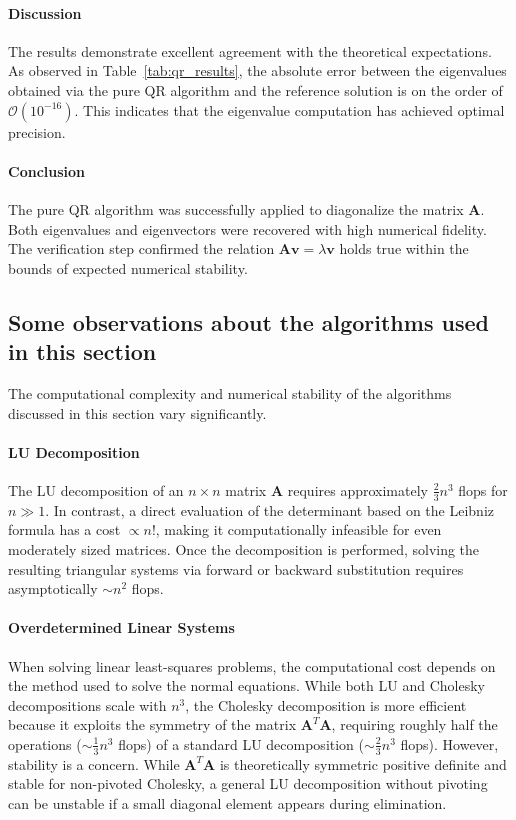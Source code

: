\begin{solution}
	\paragraph{Discussion}
	The results demonstrate excellent agreement with the theoretical
	expectations. As observed in Table~\ref{tab:qr_results}, the absolute error
	between the eigenvalues obtained via the pure QR algorithm and the reference
	solution is on the order of $\mathcal{O}(10^{-16})$. This indicates that the
	eigenvalue computation has achieved optimal precision.

	\paragraph{Conclusion}
	The pure QR algorithm was successfully applied to diagonalize the matrix
	$\mathbf{A}$. Both eigenvalues and eigenvectors were recovered with high
	numerical fidelity. The verification step confirmed the relation
	$\mathbf{A}\mathbf{v} = \lambda\mathbf{v}$ holds true within the bounds of
	expected numerical stability.

\end{solution}

\subsection{Some observations about the algorithms used in this section}

The computational complexity and numerical stability of the algorithms discussed
in this section vary significantly.

\paragraph{LU Decomposition}
The LU decomposition of an $n \times n$ matrix $\mathbf{A}$ requires
approximately $\frac{2}{3}n^3$ flops for $n \gg 1$. In contrast, a direct
evaluation of the determinant based on the Leibniz formula has a cost $\propto
n!$, making it computationally infeasible for even moderately sized matrices.
Once the decomposition is performed, solving the resulting triangular systems
via forward or backward substitution requires asymptotically $\sim n^2$ flops.

\paragraph{Overdetermined Linear Systems}
When solving linear least-squares problems, the computational cost
depends on the method used to solve the normal equations. While both LU
and Cholesky decompositions scale with $n^3$, the Cholesky
decomposition is more efficient because it exploits the symmetry of the matrix
$\mathbf{A}^T\mathbf{A}$, requiring roughly half the operations ($\sim
\frac{1}{3}n^3$ flops) of a standard LU decomposition ($\sim \frac{2}{3}n^3$
flops). However, stability is a concern. While $\mathbf{A}^T\mathbf{A}$ is
theoretically symmetric positive definite and stable for non-pivoted Cholesky, a
general LU decomposition without pivoting can be unstable if a small diagonal
element appears during elimination.

